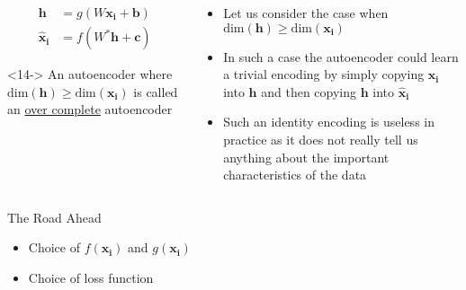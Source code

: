 \begin{frame}
	\begin{columns}
   		\begin{overlayarea}{\textwidth}{\textheight}
    			\only<1->
    			{
	        		\vspace{3pt}
		      		        
        			\vspace{-20pt}
            		\begin{align*}
            			\mathbf{h} &= g(W\mathbf{x_i} +\mathbf{b})\\
            		    \mathbf{\hat{x}_i} &=f(W^*\mathbf{h} +\mathbf{c})
            		\end{align*}
    			}

	    		\vspace{0.2cm}
    		    \begin{block}<14->{}
        		    \justifying
            		\fontsize{10pt}{7.2}\selectfont
            		An autoencoder where $\text{dim}(\mathbf{h})\geq \text{dim}(\mathbf{x_i})$ is called an \underline{over complete} autoencoder
                \end{block}
    	\end{overlayarea}

    	\begin{overlayarea}{\textwidth}{\textheight}
        	\begin{itemize}\justifying
           		\item <2-> Let us consider the case when $\text{dim}(\mathbf{h})\geq \text{dim}(\mathbf{x_i})$
           		\item <3-> In such a case the autoencoder could learn a trivial encoding by simply copying $\mathbf{x_i}$ into $\mathbf{h}$ and then copying $\mathbf{h}$ into $\mathbf{\hat{x}_i}$
           		\item <13-> Such an identity encoding is useless in practice as it does not really tell us anything about the important characteristics of the data
        	\end{itemize}
    	\end{overlayarea}
  	\end{columns}
\end{frame}

\begin{frame}
    \begin{block}{The Road Ahead}
        \begin{itemize}\justifying
            \item <2-> Choice of $f(\mathbf{x_i})$ and $g(\mathbf{x_i})$
            \item <3-> Choice of loss function
        \end{itemize}
    \end{block}
\end{frame}


